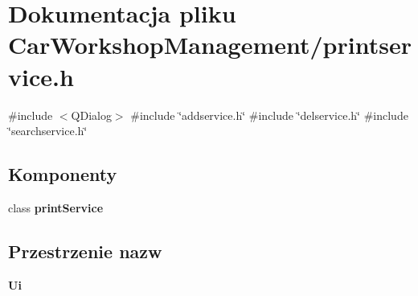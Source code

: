 \section{Dokumentacja pliku Car\+Workshop\+Management/printservice.h}
\label{printservice_8h}
{\ttfamily \#include $<$Q\+Dialog$>$}\newline
{\ttfamily \#include \char`\"{}addservice.\+h\char`\"{}}\newline
{\ttfamily \#include \char`\"{}delservice.\+h\char`\"{}}\newline
{\ttfamily \#include \char`\"{}searchservice.\+h\char`\"{}}\newline
\subsection*{Komponenty}
\begin{DoxyCompactItemize}
\item 
class \textbf{ print\+Service}
\end{DoxyCompactItemize}
\subsection*{Przestrzenie nazw}
\begin{DoxyCompactItemize}
\item 
 \textbf{ Ui}
\end{DoxyCompactItemize}
